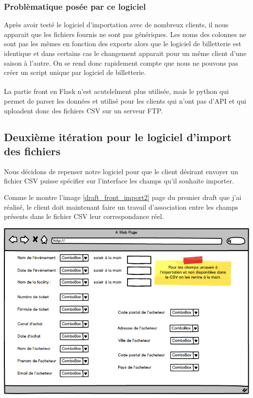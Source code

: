 \subsubsection{Problèmatique posée par ce logiciel}
Après avoir testé le logiciel d'importation avec de nombreux clients, il nous apparait que les fichiers fournis ne sont pas génériques. 
Les noms des colonnes ne sont pas les mêmes en fonction des exports alors que le logiciel de billetterie est identique et dans certains cas le changement apparait pour un même client d'une saison à l'autre. 
On se rend donc rapidement compte que nous ne pouvons pas créer un script unique par logiciel de billetterie.
\\ \\
La partie front en Flask n'est acutelelment plus utilisée, mais le python qui permet de parser les données et utilisé pour les clients qui n'ont pas d'API et qui uploadent donc des fichiers CSV sur un serveur FTP. 


\subsection{Deuxième itération pour le logiciel d'import des fichiers}
Nous décidons de repenser notre logiciel pour que le client désirant envoyer un fichier CSV puisse spécifier sur l'interface les champs qu'il souhaite importer.

Comme le montre l'image \ref{draft_front_import2} page \pageref{draft_front_import2} du premier draft que j'ai réalisé, le client doit maintenant faire un travail d'association entre les champs présents dans le fichier CSV leur correspondance réel. 

\begin{center}
\includegraphics[scale=0.55]{images/front3.png}
\label{draft_front_import2}
\end{center}


